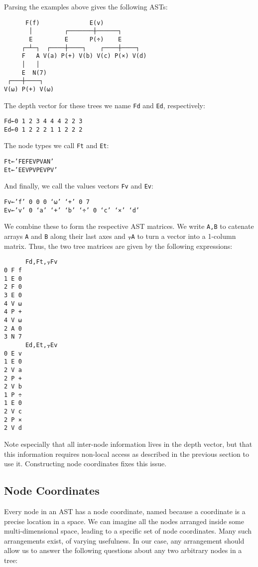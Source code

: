 \documentclass[numbers,preprint]{sigplanconf}
\begin{document}
Parsing the examples above gives the following ASTs:

\begin{verbatim}
      F(f)              E(v)
       │         ┌───────┼──────┐
       E         E      P(÷)    E
     ┌─┴─┐  ┌────┼────┐    ┌────┼────┐
     F   A V(a) P(+) V(b) V(c) P(×) V(d)
     │   │
     E  N(7) 
 ┌───┼────┐
V(⍵) P(+) V(⍵)
\end{verbatim}

The depth vector for these trees we name \verb;Fd; and \verb;Ed;, respectively:

\begin{verbatim}
Fd←0 1 2 3 4 4 4 2 2 3
Ed←0 1 2 2 2 1 1 2 2 2
\end{verbatim}

The node types we call \verb;Ft; and \verb;Et;:

\begin{verbatim}
Ft←’FEFEVPVAN’
Et←’EEVPVPEVPV’
\end{verbatim}

And finally, we call the values vectors \verb;Fv; and \verb;Ev;:

\begin{verbatim}
Fv←’f’ 0 0 0 ‘⍵’ ‘+’ 0 7
Ev←’v’ 0 ‘a’ ‘+’ ‘b’ ‘÷’ 0 ‘c’ ‘×’ ‘d’
\end{verbatim}

We combine these to form the respective AST matrices. We write \verb;A,B;
to catenate arrays \verb;A; and \verb;B; along their last axes and \verb;⍪A; to turn a
vector into a 1-column matrix. Thus, the two tree matrices are given
by the following expressions:

\begin{verbatim}
      Fd,Ft,⍪Fv
0 F f
1 E 0
2 F 0
3 E 0
4 V ⍵
4 P +
4 V ⍵
2 A 0
3 N 7
      Ed,Et,⍪Ev
0 E v
1 E 0
2 V a
2 P +
2 V b
1 P ÷
1 E 0
2 V c
2 P ×
2 V d
\end{verbatim}

Note especially that all inter-node information lives in the depth
vector, but that this information requires non-local access as
described in the previous section to use it. Constructing node
coordinates fixes this issue.

\subsection{Node Coordinates}

Every node in an AST has a node coordinate, named because a coordinate
is a precise location in a space.  We can imagine all the nodes
arranged inside some multi-dimensional space, leading to a specific
set of node coordinates. Many such arrangements exist, of varying
usefulness. In our case, any arrangement should allow us to answer
the following questions about any two arbitrary nodes in a tree:
\end{document}
